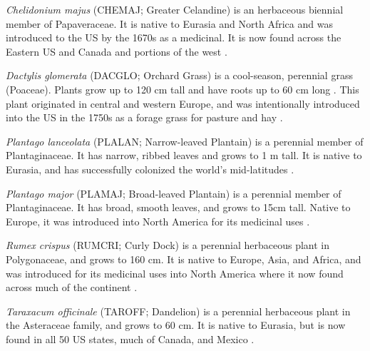 \documentclass[12pt]{article}\usepackage[]{graphicx}\usepackage[]{color}
\begin{document}
	\textit{Chelidonium majus} (CHEMAJ; Greater Celandine) is an herbaceous biennial member of Papaveraceae. It is native to Eurasia and North Africa and was introduced to the US by the 1670s as a medicinal. It is now found across the Eastern US and Canada and portions of the west \parencite{Holm1979}. 
	
	\textit{Dactylis glomerata} (DACGLO; Orchard Grass) is a cool-season, perennial grass (Poaceae). Plants grow up to 120 cm tall and have roots up to 60 cm long \parencite{Moser1996}. This plant originated in central and western Europe, and was intentionally introduced into the US in the 1750s \parencite{Bush2012} as a forage grass for pasture and hay \parencite{Ogle2011}.  
	
	\textit{Plantago lanceolata} (PLALAN; Narrow-leaved Plantain) is a perennial member of  Plantaginaceae. It has narrow, ribbed leaves and grows to 1 m tall. It is native to Eurasia, and has successfully colonized the world's mid-latitudes \parencite{Holm1977}.
	
	\textit{Plantago major} (PLAMAJ; Broad-leaved Plantain) is a perennial member of Plantaginaceae. It has broad, smooth leaves, and grows to 15cm tall. Native to Europe, it was introduced into North America for its medicinal uses \parencite{Knobloch1996,Samuelsen2000}.
	
	\textit{Rumex crispus} (RUMCRI; Curly Dock) is a perennial herbaceous plant in Polygonaceae, and grows to 160 cm. It is native to Europe, Asia, and Africa, and was introduced for its medicinal uses into North America where it now found across much of the continent \parencite{USDA2010}. 
	
	\textit{Taraxacum officinale} (TAROFF; Dandelion) is a perennial herbaceous plant in the Asteraceae family, and grows to 60 cm. It is native to Eurasia, but is now found in all 50 US states, much of Canada, and Mexico \parencite{USDA1971}.
\end{document}
